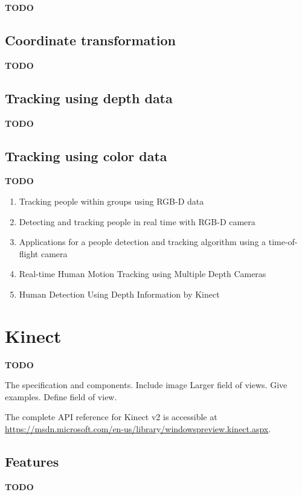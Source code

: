 \documentclass{sigchi}
\begin{document}
\textbf{TODO}

\subsection{Coordinate transformation}

\textbf{TODO}

\cite{eggert_four_algorithms}
\cite{horn_unit_quaternions}

\subsection{Tracking using depth data}

\textbf{TODO}

\subsection{Tracking using color data}

\textbf{TODO}

\begin{enumerate}
  \item Tracking people within groups using RGB-D data
  \item Detecting and tracking people in real time with RGB-D camera
  \item Applications for a people detection and tracking algorithm using a time-of-flight camera
  \item Real-time Human Motion Tracking using Multiple Depth Cameras
  \item Human Detection Using Depth Information by Kinect
\end{enumerate}

\section{Kinect}
\label{sec:kinect}

\textbf{TODO}

The specification and components. Include image Larger field of views. Give examples. Define field of view.

The complete API reference for Kinect v2 is accessible at {\url{https://msdn.microsoft.com/en-us/library/windowspreview.kinect.aspx}}.

\subsection{Features}

\textbf{TODO}
\end{document}
